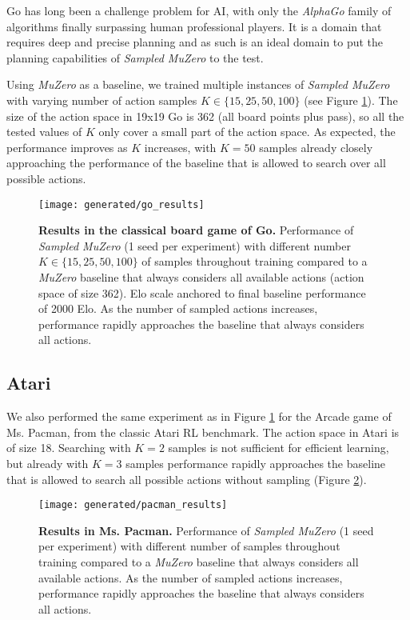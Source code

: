 \documentclass{article}
\newcommand{\muzero}{\emph{MuZero}}
\newcommand{\smuzero}{\emph{Sampled MuZero}}
\begin{document}
Go has long been a challenge problem for AI, with only the \emph{AlphaGo} \cite{Silver16AG,Silver18AZ,muzero} family of algorithms finally surpassing human professional players. It is a domain that requires deep and precise planning and as such is an ideal domain to put the planning capabilities of \smuzero{} to the test.

Using \muzero{} as a baseline, we trained multiple instances of \smuzero{} with varying number of action samples $K \in \{15, 25, 50, 100\}$ (see Figure \ref{fig:go-results}). The size of the action space in 19x19 Go is 362 (all board points plus pass), so all the tested values of $K$ only cover a small part of the action space. As expected, the performance improves as $K$ increases, with $K=50$ samples already closely approaching the performance of the baseline that is allowed to search over all possible actions.

\begin{figure}
\texttt{[image: generated/go\_results]}
\vspace*{-7mm}
\caption[]{
\label{fig:go-results}
\textbf{Results in the classical board game of Go.} Performance of \smuzero{} (1 seed per experiment) with different number $K \in \{15, 25, 50, 100\}$ of samples throughout training compared to a \muzero{} baseline that always considers all available actions (action space of size 362). Elo scale anchored to final baseline performance of 2000 Elo. As the number of sampled actions increases, performance rapidly approaches the baseline that always considers all actions.
}
\end{figure}

\subsection{Atari}
We also performed the same experiment as in Figure \ref{fig:go-results} for the Arcade game of Ms. Pacman, from the classic Atari RL benchmark. The action space in Atari is of size 18. Searching with $K = 2$ samples is not sufficient for efficient learning, but already with $K = 3$ samples performance rapidly approaches the baseline that is allowed to search all possible actions without sampling (Figure \ref{fig:pacman-results}).

\begin{figure}
\texttt{[image: generated/pacman\_results]}
\vspace*{-7mm}
\caption[]{
\label{fig:pacman-results}
\textbf{Results in Ms. Pacman.} Performance of \smuzero{} (1 seed per experiment) with different number of samples throughout training compared to a \muzero{} baseline that always considers all available actions. As the number of sampled actions increases, performance rapidly approaches the baseline that always considers all actions.
}
\end{figure}
\end{document}
